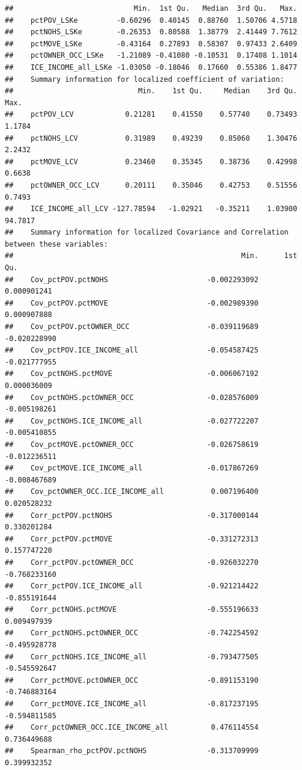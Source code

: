 \documentclass[
]{book}
\begin{document}
\begin{verbatim}
##                            Min.  1st Qu.   Median  3rd Qu.   Max.
##    pctPOV_LSKe         -0.60296  0.40145  0.88760  1.50706 4.5718
##    pctNOHS_LSKe        -0.26353  0.80588  1.38779  2.41449 7.7612
##    pctMOVE_LSKe        -0.43164  0.27893  0.58307  0.97433 2.6409
##    pctOWNER_OCC_LSKe   -1.21089 -0.41080 -0.10531  0.17408 1.1014
##    ICE_INCOME_all_LSKe -1.03050 -0.18046  0.17660  0.55386 1.8477
##    Summary information for localized coefficient of variation:
##                             Min.    1st Qu.     Median    3rd Qu.    Max.
##    pctPOV_LCV            0.21281    0.41550    0.57740    0.73493  1.1784
##    pctNOHS_LCV           0.31989    0.49239    0.85060    1.30476  2.2432
##    pctMOVE_LCV           0.23460    0.35345    0.38736    0.42998  0.6638
##    pctOWNER_OCC_LCV      0.20111    0.35046    0.42753    0.51556  0.7493
##    ICE_INCOME_all_LCV -127.78594   -1.02921   -0.35211    1.03900 94.7817
##    Summary information for localized Covariance and Correlation between these variables:
##                                                     Min.      1st Qu.
##    Cov_pctPOV.pctNOHS                       -0.002293092  0.000901241
##    Cov_pctPOV.pctMOVE                       -0.002989390  0.000907888
##    Cov_pctPOV.pctOWNER_OCC                  -0.039119689 -0.020228990
##    Cov_pctPOV.ICE_INCOME_all                -0.054587425 -0.021777955
##    Cov_pctNOHS.pctMOVE                      -0.006067192  0.000036009
##    Cov_pctNOHS.pctOWNER_OCC                 -0.028576009 -0.005198261
##    Cov_pctNOHS.ICE_INCOME_all               -0.027722207 -0.005410855
##    Cov_pctMOVE.pctOWNER_OCC                 -0.026758619 -0.012236511
##    Cov_pctMOVE.ICE_INCOME_all               -0.017867269 -0.008467689
##    Cov_pctOWNER_OCC.ICE_INCOME_all           0.007196400  0.020528232
##    Corr_pctPOV.pctNOHS                      -0.317000144  0.330201284
##    Corr_pctPOV.pctMOVE                      -0.331272313  0.157747220
##    Corr_pctPOV.pctOWNER_OCC                 -0.926032270 -0.768233160
##    Corr_pctPOV.ICE_INCOME_all               -0.921214422 -0.855191644
##    Corr_pctNOHS.pctMOVE                     -0.555196633  0.009497939
##    Corr_pctNOHS.pctOWNER_OCC                -0.742254592 -0.495928778
##    Corr_pctNOHS.ICE_INCOME_all              -0.793477505 -0.545592647
##    Corr_pctMOVE.pctOWNER_OCC                -0.891153190 -0.746883164
##    Corr_pctMOVE.ICE_INCOME_all              -0.817237195 -0.594811585
##    Corr_pctOWNER_OCC.ICE_INCOME_all          0.476114554  0.736449688
##    Spearman_rho_pctPOV.pctNOHS              -0.313709999  0.399932352

\end{verbatim}
\end{document}
